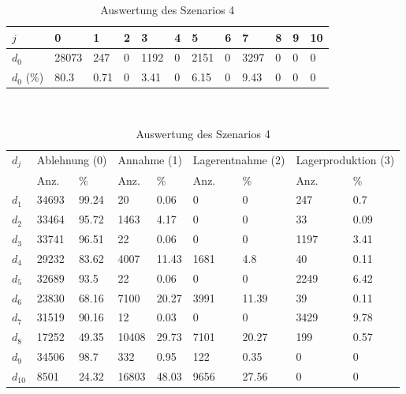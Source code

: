 \begin{table}[h!]
\renewcommand{\arraystretch}{1.5}
  \begin{center}
    \caption{Auswertung des Szenarios 4}  \label{AS4}
    \vspace*{3mm}
    \begin{tabular}{l l l l l l l l l l l l }  \hline 
         $j$ & 0 & 1  & 2 & 3 & 4  & 5 & 6 & 7 & 8 & 9 & 10  \\  \hline
$d_{0}$ &  28073 &   247 &  0 &  1192 &  0 &  2151 &  0 &  3297 &  0 &  0 &  0 \\
$d_{0}$ (\%) &   80.3 &  0.71 &  0 &  3.41 &  0 &  6.15 &  0 &  9.43 &  0 &  0 &  0 \\
\hline
    \end{tabular} \\[3mm]
        \begin{tabular}{ l l l l l l l l l}   \hline    %
    $d_j$ & \multicolumn{2}{c}{Ablehnung (0)} & \multicolumn{2}{c}{Annahme (1)}  & \multicolumn{2}{c}{Lagerentnahme (2)} & \multicolumn{2}{c}{Lagerproduktion (3)}\\
    & Anz. & \% & Anz. & \% & Anz. & \% & Anz. & \% \\ \hline 
$d_{1}$  &  34693 &  99.24 &     20 &   0.06 &   0 &    0 &   247 &   0.7 \\
$d_{2}$  &  33464 &  95.72 &   1463 &   4.17 &   0 &    0 &    33 &  0.09 \\
$d_{3}$  &  33741 &  96.51 &     22 &   0.06 &   0 &    0 &  1197 &  3.41 \\
$d_{4}$  &  29232 &  83.62 &   4007 &  11.43 &  1681 &    4.8 &    40 &  0.11 \\
$d_{5}$  &  32689 &   93.5 &     22 &   0.06 &   0 &    0 &  2249 &  6.42 \\
$d_{6}$  &  23830 &  68.16 &   7100 &  20.27 &  3991 &  11.39 &    39 &  0.11 \\
$d_{7}$  &  31519 &  90.16 &     12 &   0.03 &   0 &    0 &  3429 &  9.78 \\
$d_{8}$  &  17252 &  49.35 &  10408 &  29.73 &  7101 &  20.27 &   199 &  0.57 \\
$d_{9}$  &  34506 &   98.7 &    332 &   0.95 &   122 &   0.35 &   0 &   0 \\
$d_{10}$ &   8501 &  24.32 &  16803 &  48.03 &  9656 &  27.56 &   0 &   0 \\
          \hline
   \end{tabular} \\[3mm]
     \end{center}
\end{table}

